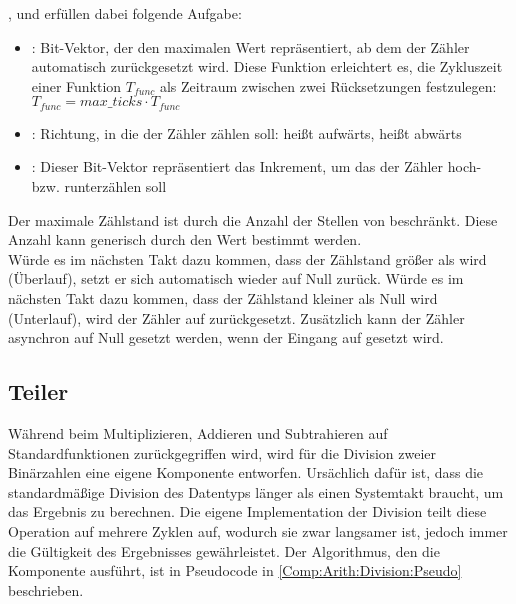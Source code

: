 ,  und  erfüllen dabei folgende Aufgabe:

\begin{itemize}
\item {}: Bit-Vektor, der den maximalen Wert repräsentiert, ab dem der Zähler automatisch zurückgesetzt wird.
Diese Funktion erleichtert es, die Zykluszeit einer Funktion $T_{func}$ als Zeitraum zwischen zwei Rücksetzungen festzulegen: $T_{func} = max\_ticks \cdot T_{func}$
\item {}: Richtung, in die der Zähler zählen soll:  heißt aufwärts,  heißt abwärts
  \item {}: Dieser Bit-Vektor repräsentiert das Inkrement, um das der Zähler hoch- bzw. runterzählen soll
\end{itemize}

Der maximale Zählstand ist durch die Anzahl der Stellen von  beschränkt.
Diese Anzahl kann generisch durch den Wert  bestimmt werden. \\
Würde es im nächsten Takt dazu kommen, dass der Zählstand größer als  wird (Überlauf), setzt er sich automatisch wieder auf Null zurück.
Würde es im nächsten Takt dazu kommen, dass der Zählstand kleiner als Null wird (Unterlauf), wird der Zähler auf  zurückgesetzt.
Zusätzlich kann der Zähler asynchron auf Null gesetzt werden, wenn der Eingang  auf  gesetzt wird.


\subsection{Teiler} \label{Comp:Arith:Division}

Während beim Multiplizieren, Addieren und Subtrahieren auf Standardfunktionen zurückgegriffen wird, wird für die Division zweier Binärzahlen eine eigene Komponente entworfen.
Ursächlich dafür ist, dass die standardmäßige Division des  Datentyps länger als einen Systemtakt braucht, um das Ergebnis zu berechnen.
Die eigene Implementation der Division teilt diese Operation auf mehrere Zyklen auf, wodurch sie zwar langsamer ist, jedoch immer die Gültigkeit des Ergebnisses gewährleistet.
Der Algorithmus, den die Komponente ausführt, ist in Pseudocode in \cref{Comp:Arith:Division:Pseudo} beschrieben.

